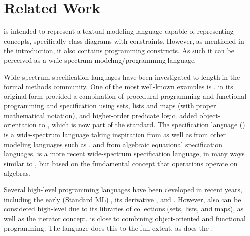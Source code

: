 
\section{Related Work}
\label{sec:related-work}

\Klang{} is intended to represent a textual modeling language capable of representing \sysml{} concepts, specifically class diagrams with constraints.
However, as mentioned in the introduction, it also contains programming constructs.
As such it can be perceived as a wide-spectrum modeling/programming language.

Wide spectrum specification languages have been investigated to length in the formal 
methods community. One of the most well-known examples is \vdm{} 
\cite{vdm78,bjoerner-jones-82,jones90,jones-shaw-90}. \vdm{} in its
original form \cite{vdm78} provided a combination of procedural programming and
functional programming and specification using sets, lists and maps (with proper 
mathematical notation), and higher-order predicate logic. \vdmpp{} 
\cite{vdmplusplus05} added object-orientation to \vdm{}, which is now part of
the \vdm{} standard. The \raiselang{} specification language (\rsl{})
\cite{raise92} is a wide-spectrum language taking inspiration from \vdm{} as well as 
from other modeling languages such as \zlang{} \cite{spivey-Z-1988}, and from 
algebraic equational specification languages. \asml{} \cite{asml05} is a more recent 
wide-spectrum
specification language, in many ways similar to \vdm{}, but based on the fundamental 
concept that operations operate on algebras.

Several high-level programming languages have been developed in recent years,
including  the early \sml{} (Standard ML) \cite{standard-ml-97}, its derivative
\ocaml{} \cite{ocaml}, and \haskell{} \cite{haskell}. However, also \java{}
can be considered high-level due to its libraries of collections (sets, lists, and 
maps), as well as the iterator concept. \python{} \cite{python} is close to 
combining object-oriented and functional programming. The 
\scala{} \cite{scala} language does this to the full extent, as does the
\fortress{} \cite{fortress}.

